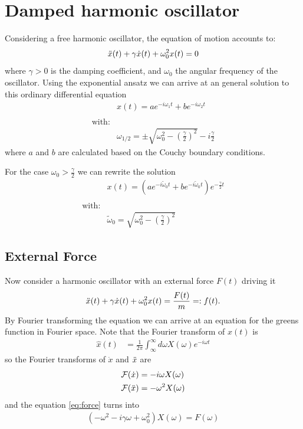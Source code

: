 \documentclass[a4paper]{article}
\begin{document}
\section{Damped harmonic oscillator}
Considering a free harmonic oscillator, the equation of motion accounts to:
\begin{equation}
    \Ddot{x}(t)+\gamma\Dot{x}(t)+\omega_0^2x(t)=0
\end{equation}
where $\gamma > 0$ is the damping coefficient, and $\omega_0$ the angular frequency
of the oscillator. Using the exponential ansatz we can arrive at an general
solution to this ordinary differential equation
\begin{align}
    &x(t) = a e^{-i\omega_1 t} + b e^{-i\omega_2 t} \\
    &\nonumber \\
    \text{with:} \nonumber\\
    &\omega_{1/2} = \pm \sqrt{\omega_0^2 - (\frac{\gamma}{2})^2} -
    i\frac{\gamma}{2}
\end{align}
where $a$ and $b$ are calculated based on the Couchy boundary conditions.

For the case $\omega_0 > \frac{\gamma}{2}$ we can rewrite the solution
\begin{align}
    &x(t) = \left(a e^{-i\tilde{\omega}_0 t} + b e^{-i\tilde{\omega}_0
    t}\right) e^{-\frac{\gamma}{2}t}\\
    &\nonumber \\
    \text{with:} \nonumber\\
    &\tilde{\omega}_{0} = \sqrt{\omega_0^2 - \left(\frac{\gamma}{2}\right)^2}
\end{align}
\subsection{External Force}

Now consider a harmonic oscillator with an external force $F(t)$ driving it
\begin{align}\label{eq:force}
    \Ddot{x}(t)+\gamma\Dot{x}(t)+\omega_0^2x(t)=\frac{F(t)}{m} =: f(t).
\end{align}
By Fourier transforming the equation we can arrive at an equation for the
greens function in Fourier space. Note that the Fourier transform of
$x(t)$ is
\begin{align}
   \hat{x}(t) &= \frac{1}{2\pi}\int_\infty^\infty d\omega
    X(\omega) e^{-i\omega t}
\end{align}
so the Fourier transforms of $\dot{x}$ and $\Ddot{x}$ are
\begin{align}
    \mathcal{F}(\dot{x}) &= -i\omega X(\omega)\\
    \mathcal{F}(\Ddot{x}) &= -\omega^2 X(\omega)\\
\end{align}
and the equation \ref{eq:force} turns into
\begin{align}
    (-\omega^2 - i\gamma \omega + \omega_0^2) X(\omega) = F(\omega)
\end{align}
\end{document}
